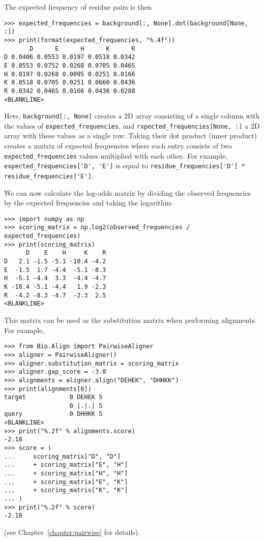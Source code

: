 The expected frequency of residue pairs is then
\begin{verbatim}
>>> expected_frequencies = background[:, None].dot(background[None, :])
>>> print(format(expected_frequencies, "%.4f"))
       D      E      H      K      R
D 0.0406 0.0553 0.0197 0.0518 0.0342
E 0.0553 0.0752 0.0268 0.0705 0.0465
H 0.0197 0.0268 0.0095 0.0251 0.0166
K 0.0518 0.0705 0.0251 0.0660 0.0436
R 0.0342 0.0465 0.0166 0.0436 0.0288
<BLANKLINE>
\end{verbatim}
Here, \verb+background[:, None]+ creates a 2D array consisting of a single column with the values of \verb+expected_frequencies+, and \verb+rxpected_frequencies[None, :]+ a 2D array with these values as a single row. Taking their dot product (inner product) creates a matrix of expected frequencies where each entry consists of two \verb+expected_frequencies+ values multiplied with each other. For example, \verb+expected_frequencies['D', 'E']+ is equal to \verb+residue_frequencies['D'] * residue_frequencies['E']+.

We can now calculate the log-odds matrix by dividing the observed frequencies by the expected frequencies and taking the logarithm:
\begin{verbatim}
>>> import numpy as np
>>> scoring_matrix = np.log2(observed_frequencies / expected_frequencies)
>>> print(scoring_matrix)
      D    E    H     K    R
D   2.1 -1.5 -5.1 -10.4 -4.2
E  -1.5  1.7 -4.4  -5.1 -8.3
H  -5.1 -4.4  3.3  -4.4 -4.7
K -10.4 -5.1 -4.4   1.9 -2.3
R  -4.2 -8.3 -4.7  -2.3  2.5
<BLANKLINE>
\end{verbatim}

This matrix can be used as the substitution matrix when performing alignments. For example,
\begin{verbatim}
>>> from Bio.Align import PairwiseAligner
>>> aligner = PairwiseAligner()
>>> aligner.substitution_matrix = scoring_matrix
>>> aligner.gap_score = -3.0
>>> alignments = aligner.align("DEHEK", "DHHKK")
>>> print(alignments[0])
target            0 DEHEK 5
                  0 |.|.| 5
query             0 DHHKK 5
<BLANKLINE>
>>> print("%.2f" % alignments.score)
-2.18
>>> score = (
...     scoring_matrix["D", "D"]
...     + scoring_matrix["E", "H"]
...     + scoring_matrix["H", "H"]
...     + scoring_matrix["E", "K"]
...     + scoring_matrix["K", "K"]
... )
>>> print("%.2f" % score)
-2.18
\end{verbatim}
(see Chapter~\ref{chapter:pairwise} for details).

